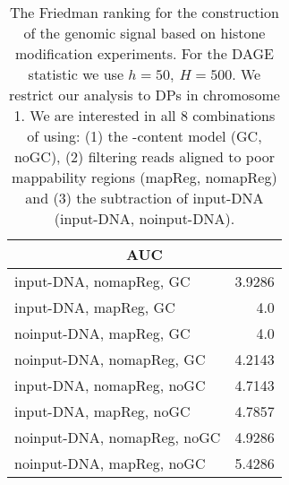 \begin{table}[h!]
\label{tab:ranking}
\begin{center}
\renewcommand{\arraystretch}{1.2}
  \begin{tabular}{ |lr| }
    \hline
    \multicolumn{2}{|c|}{\textbf{AUC}} \\
    \hline
    input-DNA, nomapReg, GC & 3.9286 \\
    input-DNA, mapReg, GC & 4.0 \\
    noinput-DNA, mapReg, GC & 4.0 \\
    noinput-DNA, nomapReg, GC & 4.2143 \\
    input-DNA, nomapReg, noGC & 4.7143 \\
    input-DNA, mapReg, noGC & 4.7857 \\
    noinput-DNA, nomapReg, noGC & 4.9286 \\
    noinput-DNA, mapReg, noGC & 5.4286 \\
    \hline
  \end{tabular}
\end{center}
\caption[Friedman ranking of ODIN's parametrization for histone experiments]{The Friedman ranking for the construction of the genomic signal based on histone modification experiments. 
For the DAGE statistic we use $h=50,\ H=500$. 
We restrict our analysis to DPs in chromosome 1.
We are interested in all 8 combinations of using: (1) the -content model (GC, noGC), (2) filtering reads aligned to poor mappability regions (mapReg, nomapReg) and (3) the subtraction of input-DNA (input-DNA, noinput-DNA).}
\label{tab_preprocess_hist}
\end{table}

